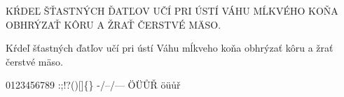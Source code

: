 KŔDEĽ ŠŤASTNÝCH ĎATĽOV UČÍ PRI ÚSTÍ VÁHU MĹKVÉHO KOŇA OBHRÝZAŤ KÔRU A ŽRAŤ ČERSTVÉ MÄSO.

Kŕdeľ šťastných ďatľov učí pri ústí Váhu mĺkveho koňa obhrýzať kôru a žrať čerstvé mäso.

0123456789 :;!?()[]\{\} -/--/--- ÖÜŮŘ öüůř

